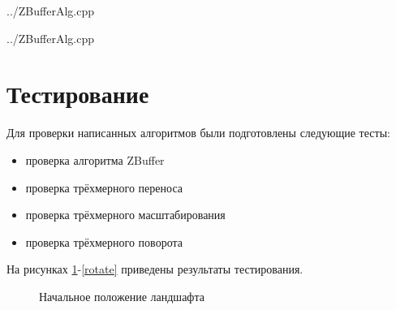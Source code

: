 \begin{lstinputlisting}[
	caption={Обычный алгоритм ZBuffer},
	label={ZBufferAlg::execute},
	style={c},
	linerange={16-33},
	]{../ZBufferAlg.cpp}
\end{lstinputlisting}

\newpage
\begin{lstinputlisting}[
	caption={Многопоточный алгоритм ZBuffer},
	label={ZBufferAlg::executeWithTrheads},
	style={c},
	linerange={58-89},
	]{../ZBufferAlg.cpp}
\end{lstinputlisting}

\section{Тестирование}
Для проверки написанных алгоритмов были подготовлены следующие тесты:
\begin{itemize}
	\item проверка алгоритма ZBuffer
	\item проверка трёхмерного переноса
	\item проверка трёхмерного масштабирования
	\item проверка трёхмерного поворота
\end{itemize}

На рисунках \ref{start}-\ref{rotate} приведены результаты тестирования.

\begin{figure}[h]
	\caption{Начальное положение ландшафта}
	\label{start}
\end{figure}

